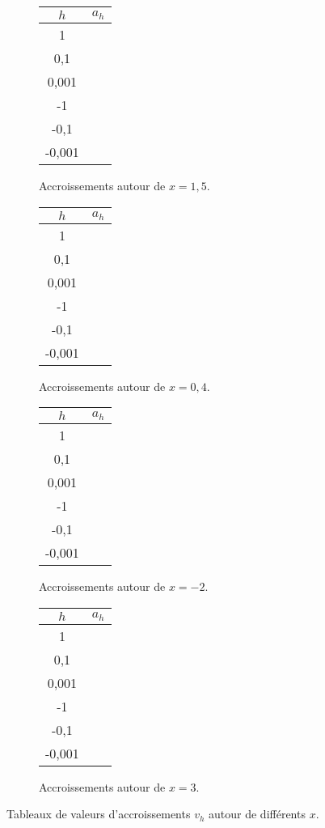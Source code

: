 \begin{figure}[h!]
	\begin{subfigure}{0.2\textwidth}
	\begin{tabular}{|c|c|}\hline
		$h$ & $a_h$ \\ \hline
		1 & \hspace{1cm} \\ \hline
		0,1 & \\ \hline
		0,001 & \\ \hline
		-1 & \\ \hline
		-0,1 & \\ \hline
		-0,001 & \\ \hline
	\end{tabular}
	\caption{Accroissements autour de $x=1,5$.}
	\label{fig:1e}
	\end{subfigure}
	\hfill
	\begin{subfigure}{0.2\textwidth}
	\begin{tabular}{|c|c|}\hline
		$h$ & $a_h$ \\ \hline
		1 & \hspace{1cm} \\ \hline
		0,1 & \\ \hline
		0,001 & \\ \hline
		-1 & \\ \hline
		-0,1 & \\ \hline
		-0,001 & \\ \hline
	\end{tabular}
	\caption{Accroissements autour de $x=0,4$.}
	\label{fig:1f}
	\end{subfigure}
	\hfill
	\begin{subfigure}{0.2\textwidth}
	\begin{tabular}{|c|c|}\hline
		$h$ & $a_h$ \\ \hline
		1 & \hspace{1cm} \\ \hline
		0,1 & \\ \hline
		0,001 & \\ \hline
		-1 & \\ \hline
		-0,1 & \\ \hline
		-0,001 & \\ \hline
	\end{tabular}
	\caption{Accroissements autour de $x=-2$.}
	\label{fig:1g}
	\end{subfigure}
	\hfill
	\begin{subfigure}{0.2\textwidth}
	\begin{tabular}{|c|c|}\hline
		$h$ & $a_h$ \\ \hline
		1 & \hspace{1cm} \\ \hline
		0,1 & \\ \hline
		0,001 & \\ \hline
		-1 & \\ \hline
		-0,1 & \\ \hline
		-0,001 & \\ \hline
	\end{tabular}
	\caption{Accroissements autour de $x=3$.}
	\label{fig:h}
	\end{subfigure}
	\caption{Tableaux de valeurs d'accroissements $v_h$ autour de différents $x$.}
	\label{fig:vh}
\end{figure}


